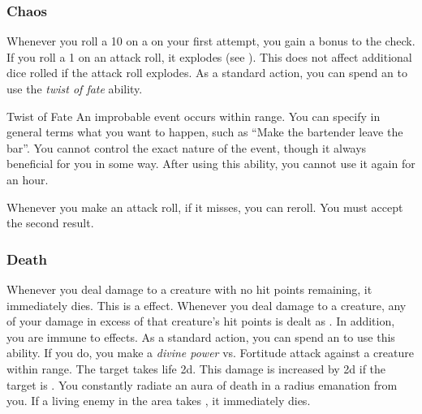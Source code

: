         \subsubsection{Chaos}
             Whenever you roll a 10 on a  on your first attempt, you gain a  bonus to the check.
             If you roll a 1 on an attack roll, it explodes (see ).
            This does not affect additional dice rolled if the attack roll explodes.
             As a standard action, you can spend an  to use the \textit{twist of fate} ability.
            \begin{ability}{Twist of Fate}
                An improbable event occurs within \rnglong range.
                You can specify in general terms what you want to happen, such as ``Make the bartender leave the bar''.
                You cannot control the exact nature of the event, though it always beneficial for you in some way.
                After using this ability, you cannot use it again for an hour.
            \end{ability}
             Whenever you make an attack roll, if it misses, you can reroll.
            You must accept the second result.

        \subsubsection{Death}
             Whenever you deal damage to a creature with no hit points remaining, it immediately dies.
            This is a  effect.
             Whenever you deal damage to a creature, any of your damage in excess of that creature's hit points is dealt as .
            In addition, you are immune to  effects.
             As a standard action, you can spend an  to use this ability.
            If you do, you make a \textit{divine power} vs. Fortitude attack against a creature within \rngmed range.
            \hit The target takes life  \plus2d.
            This damage is increased by \plus2d if the target is .
             You constantly radiate an aura of death in a \areahuge radius emanation from you.
            If a living enemy in the area takes , it immediately dies.

